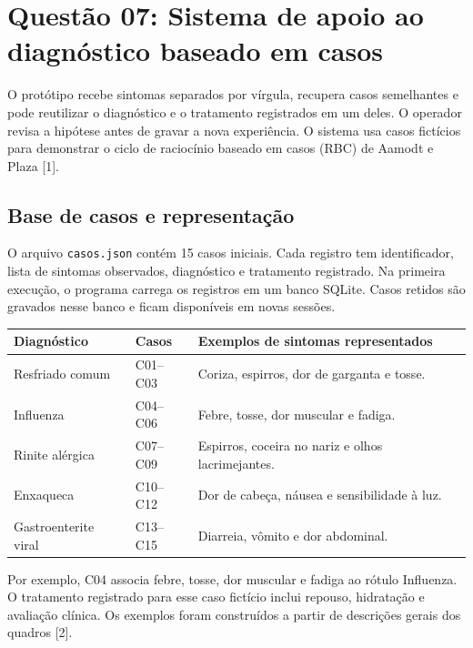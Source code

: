 \documentclass[12pt,a4paper]{article}
\begin{document}
\section{Questão 07: Sistema de apoio ao diagnóstico baseado em casos}

O protótipo recebe sintomas separados por vírgula, recupera casos semelhantes e pode reutilizar o diagnóstico e o tratamento registrados em um deles. O operador revisa a hipótese antes de gravar a nova experiência. O sistema usa casos fictícios para demonstrar o ciclo de raciocínio baseado em casos (RBC) de Aamodt e Plaza [1].

\subsection{Base de casos e representação}

O arquivo \texttt{casos.json} contém 15 casos iniciais. Cada registro tem identificador, lista de sintomas observados, diagnóstico e tratamento registrado. Na primeira execução, o programa carrega os registros em um banco SQLite. Casos retidos são gravados nesse banco e ficam disponíveis em novas sessões.

\begin{table}[htbp]
    \centering
    \begin{tabular}{>{\raggedright\arraybackslash}p{3.8cm} >{\raggedright\arraybackslash}p{2.0cm} >{\raggedright\arraybackslash}p{8.7cm}}
        \toprule
        \textbf{Diagnóstico} & \textbf{Casos} & \textbf{Exemplos de sintomas representados} \\
        \midrule
        Resfriado comum & C01--C03 & Coriza, espirros, dor de garganta e tosse. \\
        \addlinespace
        Influenza & C04--C06 & Febre, tosse, dor muscular e fadiga. \\
        \addlinespace
        Rinite alérgica & C07--C09 & Espirros, coceira no nariz e olhos lacrimejantes. \\
        \addlinespace
        Enxaqueca & C10--C12 & Dor de cabeça, náusea e sensibilidade à luz. \\
        \addlinespace
        Gastroenterite viral & C13--C15 & Diarreia, vômito e dor abdominal. \\
        \bottomrule
    \end{tabular}
\end{table}

Por exemplo, C04 associa febre, tosse, dor muscular e fadiga ao rótulo Influenza. O tratamento registrado para esse caso fictício inclui repouso, hidratação e avaliação clínica. Os exemplos foram construídos a partir de descrições gerais dos quadros [2].
\end{document}
